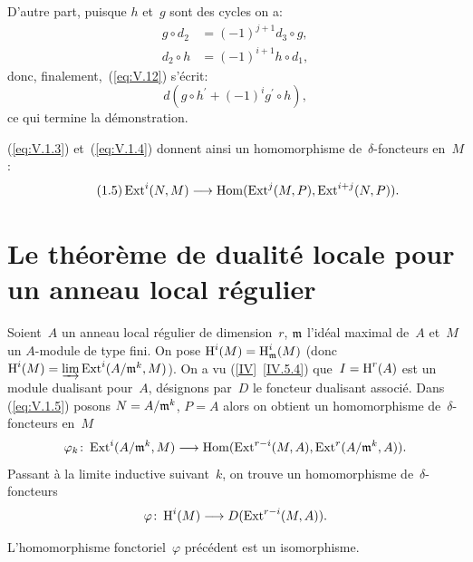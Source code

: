 D'autre part, puisque $h$ et~$g$ sont des cycles on a:
\begin{align*}
g\circ d_{2} &= (-1)^{j+1}d_{3}\circ g, \\
d_{2}\circ h &= (-1)^{i+1}h\circ d_{1},
\end{align*}
donc, finalement,~(\ref{eq:V.12}) s'\'ecrit:
$$d(g\circ h^{\prime}+(-1)^{i}g^{\prime}\circ h),
$$
ce qui termine la d\'emonstration.

(\ref{eq:V.1.3}) et~(\ref{eq:V.1.4}) donnent ainsi un homomorphisme de~$\delta$-foncteurs en~$M$:
\begin{equation*} \label{eq:V.1.5} \tag{1.5} \Ext^{i}(N, M)\to\Hom(\Ext^{j}(M, P), \Ext^{i+j}(N, P)).
\end{equation*}

\section{Le th\'eor\`eme de dualit\'e locale pour un anneau local r\'egulier} \label{V.2}

\setcounter{equation}{12}

Soient~$A$ un anneau local r\'egulier de dimension~$r$, $\mathfrak{m}$ l'id\'eal maximal de~$A$ et~$M$ un $A$-module de type fini. \label{pV2.4}On pose $\operatorname{H}^{i}(M)=\operatorname{H}^{i}_{\mathfrak{m}}(M)$ (donc $\operatorname{H}^{i}(M)=\varinjlim\operatorname{Ext}^{i}(A/\mathfrak{m}^{k}, M)$). On a vu (\ref{IV}~\ref{IV.5.4}) que~$I=\operatorname{H}^{r}(A)$ est un module dualisant pour~$A$, d\'esignons par~$D$ le foncteur dualisant associ\'e. Dans (\ref{eq:V.1.5}) posons $N=A/\mathfrak{m}^{k}$, $P=A$ alors on obtient un homomorphisme de~$\delta$-foncteurs en~$M$
\begin{equation} \label{eq:V.13} \varphi_{k}\colon\Ext^{i}(A/\mm^{k}, M)\to\Hom(\Ext^{r-i}(M, A), \Ext^{r}(A/\mm^{k}, A)).
\end{equation}
Passant \`a la limite inductive suivant~$k$, on trouve un homomorphisme de~$\delta$-foncteurs
\begin{equation} \label{eq:V.14} \varphi\colon\H^{i}(M)\to D(\Ext^{r-i}(M, A)).
\end{equation}

\begin{theoreme} \label{V.2.1}
L'homomorphisme fonctoriel~$\varphi$ pr\'ec\'edent est un isomorphisme.
\end{theoreme}

